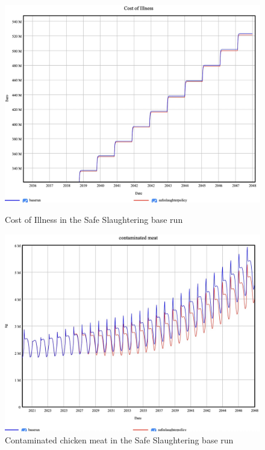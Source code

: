 \begin{figure}[h!]
    \centering
    \begin{minipage}{0.45\textwidth}
        \centering
        \includegraphics[width=1\textwidth]{images/p_coi.jpeg} 
        \caption{Cost of Illness in the Safe Slaughtering base run}
        \label{fig:p_coi}
    \end{minipage}\hfill
    \begin{minipage}{0.45\textwidth}
        \centering
        \includegraphics[width=1\textwidth]{images/p_meat.jpeg}
        \caption{Contaminated chicken meat in the Safe Slaughtering base run}
        \label{fig:p_meat}
    \end{minipage}
\end{figure} 

